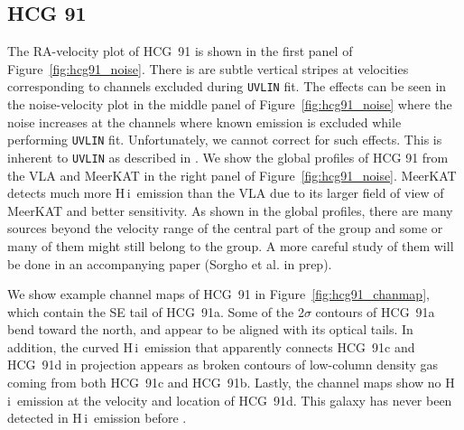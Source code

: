 \documentclass{aa}
\newcommand{\HI}{H\,{\sc i}}
\begin{document}
\subsection{HCG 91}
The RA-velocity plot of HCG~91 is shown in the first panel of Figure~\ref{fig:hcg91_noise}. There is are subtle vertical stripes at velocities corresponding to channels 
excluded during \texttt{UVLIN} fit. The effects can be seen in the noise-velocity plot in the middle panel of 
Figure~\ref{fig:hcg91_noise} where the noise increases at the channels where known emission is excluded while performing \texttt{UVLIN} fit. Unfortunately, we cannot correct for such effects. 
This is inherent to \texttt{UVLIN} as described in \citet{2023A&A...673A.146S}. We show the global profiles of HCG 91 from the VLA and MeerKAT in the right panel of Figure~\ref{fig:hcg91_noise}. 
MeerKAT detects much more \HI\ emission than the VLA due to its larger field of view of MeerKAT and better sensitivity. 
As shown in the global profiles, there are many sources beyond the velocity range of the central part of the group and some or many of them might still belong to the group. 
A more careful study of them will be done in an accompanying paper (Sorgho et al. in prep). 


We show example channel maps of HCG~91 in Figure~\ref{fig:hcg91_chanmap}, which contain the SE tail of HCG~91a. Some of the 2$\sigma$ contours of HCG~91a bend toward the north, and appear 
to be aligned with its optical tails. In addition, the curved \HI\ emission that apparently connects HCG~91c and HCG~91d in projection appears as broken contours of low-column density 
gas coming from both HCG~91c and HCG~91b. Lastly, the channel maps show no \HI\ emission at the velocity and location of HCG~91d. This galaxy has never been detected in \HI\ emission 
before \citep{2023A&A...670A..21J}.  
\end{document}
